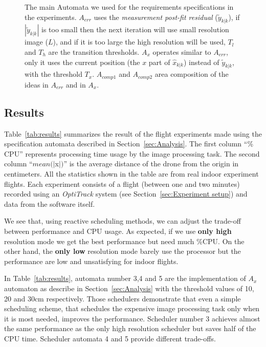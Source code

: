 \documentclass{sig-alternate-ipsn13}
\begin{document}
\begin{figure}[htbp]
\begin{tabular}{c c}
        
    \end{tabular}
    
    \caption{The main Automata we used for the requirements specifications in the experiments. 
        \newline $A_{err}$ uses the \textit{measurement post-fit residual} ($\tilde{y}_{k|k}$), if $|\tilde{y}_{k|k}|$ is too small then the next iteration will use small resolution image ($L$), and if it is too large the high resolution will be used, $T_l$ and $T_h$ are the transition thresholds.
         $A_x$ operates similar to $A_{err}$, only it uses the current position (the $x$ part of $\hat{x}_{k|k}$) instead of $\tilde{y}_{k|k}$, with the threshold $T_x$.
         $A_{comp1}$ and $A_{comp2}$ area composition of the ideas in $A_{err}$ and in $A_x$.}
    
    \label{fig:test_automata}
\end{figure}


\subsection{Results}
\label{sec:results}

Table~\ref{tab:results} summarizes the result of the flight experiments made using the specification automata described in Section~\ref{sec:Analysis}.
The first column ``\% CPU'' represents processing time usage by the image processing task.
The second column ``$mean(|$x$|)$'' is the average distance of the drone from the origin in centimeters.
All the statistics shown in the table are from real indoor experiment flights. Each experiment consists of a flight (between one and two minutes) recorded using an \textit{OptiTrack} system (see Section~\ref{sec:Experiment setup}) and data from the software itself.

We see that, using reactive scheduling methods, we can adjust the trade-off between performance and CPU usage. As expected, if we use \textbf{only high} resolution mode we get the best performance but need much \%CPU. On the other hand, the \textbf{only low} resolution mode barely use the processor but the performance are low and unsatisfying for indoor flights.

In Table~\ref{tab:results}, automata number 3,4 and 5 are the implementation of $A_{x}$ automaton as describe in Section~\ref{sec:Analysis} with the threshold values of 10, 20 and 30cm respectively.
Those schedulers demonstrate that even a simple scheduling scheme, that schedules the expensive image processing task only when it is most needed, improves the performance. Scheduler number 3 achieves almost the same performance as the only high resolution scheduler but saves half of the CPU time. Scheduler automata 4 and 5 provide different trade-offs.
\end{document}
